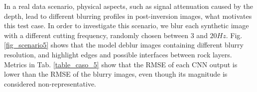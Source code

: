 \documentclass[conference]{IEEEtran}
\begin{document}
In a real data scenario, physical aspects, such as signal attenuation caused by the depth, lead to
different blurring profiles in post-inversion images, what motivates this test case.
In order to investigate this scenario, we blur each synthetic image with a different
cutting frequency, randomly chosen between $3$ and $20 Hz$. 
Fig. \ref{fig_scenario5} shows that the model deblur images containing different blurry resolution, and
highlight edges and possible interfaces between rock layers. Metrics in Tab. \ref{table_caso_5} show that the RMSE
of each CNN output is lower than the RMSE of the
blurry images, even though its magnitude is considered non-representative.
\begin{figure}[!t]
\centering
{}

\end{figure}
\end{document}
